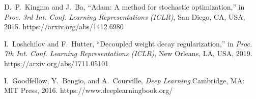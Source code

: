 \documentclass[12pt, a4paper, openany]{report}
\begin{document}
\begin{thebibliography}{}
D.~P.~Kingma and J.~Ba, ``Adam: A method for stochastic optimization,'' in \textit{Proc. 3rd Int. Conf. Learning Representations (ICLR)}, San Diego, CA, USA, 2015.
https://arxiv.org/abs/1412.6980

I.~Loshchilov and F.~Hutter, ``Decoupled weight decay regularization,'' in \textit{Proc. 7th Int. Conf. Learning Representations (ICLR)}, New Orleans, LA, USA, 2019.
https://arxiv.org/abs/1711.05101

I.~Goodfellow, Y.~Bengio, and A.~Courville, \textit{Deep Learning}.\hspace{0.5em}Cambridge, MA: MIT Press, 2016.
https://www.deeplearningbook.org/

\end{thebibliography}
\end{document}

